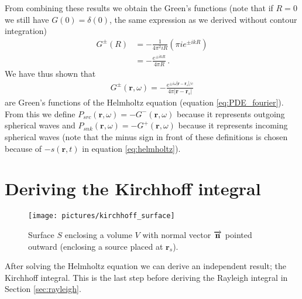 From combining these results we obtain the Green's functions (note that if $R=0$ we still have $G(0)=\delta(0)$, the same expression as we derived without contour integration)
\begin{align}
    G^\pm(R) &= -\frac{1}{4\pi^2 iR} (\pi i e^{\pm ikR}) \nonumber \\
             &= -\frac{e^{\pm ikR}}{4\pi R} \,. \nonumber
\end{align}
We have thus shown that
\begin{align}
    G^\pm(\mathbf r, \omega) = -\frac{e^{\pm i\omega |\mathbf r - \mathbf r_s|/c}}{4\pi |\mathbf r-\mathbf r_s|}
\end{align}
are Green's functions of the Helmholtz equation (equation \ref{eq:PDE_fourier}).
From this we define $P_{src} (\mathbf r, \omega) = -G^- (\mathbf r, \omega)$ because it represents outgoing spherical waves and
$P_{snk} (\mathbf r, \omega) = -G^+ (\mathbf r, \omega)$ because it represents incoming spherical waves (note that the minus sign in front of these definitions is chosen because of $-s(\mathbf r, t)$ in equation \ref{eq:helmholtz}).

\section{Deriving the Kirchhoff integral}
\begin{wrapfigure}{r}{0.3\textwidth}
    \centering
    \texttt{[image: pictures/kirchhoff\_surface]}
    \caption{Surface $S$ enclosing a volume $V$ with normal vector $\protect\overrightarrow{\mathbf n}$ pointed outward (enclosing a source placed at $\mathbf r_s$).}
    \vspace{-1em}
    \label{fig:volume}
\end{wrapfigure}
After solving the Helmholtz equation we can derive an independent result; the Kirchhoff integral.
This is the last step before deriving the Rayleigh integral in Section \ref{sec:rayleigh}.

